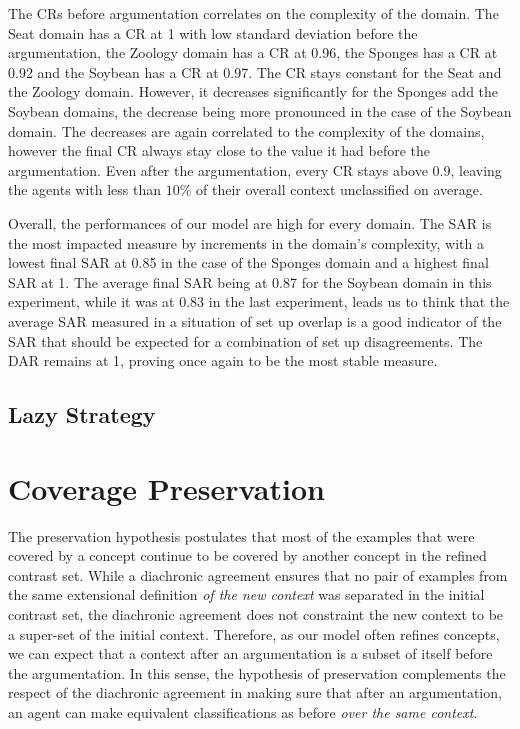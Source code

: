 The CRs before argumentation correlates on the complexity of the domain. The Seat domain has a CR at 1 with low standard deviation before the argumentation, the Zoology domain has a CR at 0.96, the Sponges has a CR at 0.92 and the Soybean has a CR at 0.97. The CR stays constant for the Seat and the Zoology domain. However, it decreases significantly for the Sponges add the Soybean domains, the decrease being more pronounced in the case of the Soybean domain. The decreases are again correlated to the complexity of the domains, however the final CR always stay close to the value it had before the argumentation. Even after the argumentation, every CR stays above 0.9, leaving the agents with less than $10\%$ of their overall context unclassified on average.

Overall, the performances of our model are high for every domain. The SAR is the most impacted measure by increments in the domain's complexity, with a lowest final SAR at 0.85 in the case of the Sponges domain and a highest final SAR at 1. The average final SAR being at 0.87 for the Soybean domain in this experiment, while it was at 0.83 in the last experiment, leads us to think that the average SAR measured in a situation of set up overlap is a good indicator of the SAR that should be expected for a combination of set up disagreements. The DAR remains at 1, proving once again to be the most stable measure.

\subsection{Lazy Strategy}

\section{Coverage Preservation}

The preservation hypothesis postulates that most of the examples that were covered by a concept continue to be covered by another concept in the refined contrast set. While a diachronic agreement ensures that no pair of examples from the same extensional definition \emph{of the new context} was separated in the initial contrast set, the diachronic agreement does not constraint the new context to be a super-set of the initial context. Therefore, as our model often refines concepts, we can expect that a context after an argumentation is a subset of itself before the argumentation. In this sense, the hypothesis of preservation complements the respect of the diachronic agreement in making sure that after an argumentation, an agent can make equivalent classifications as before \emph{over the same context}.

